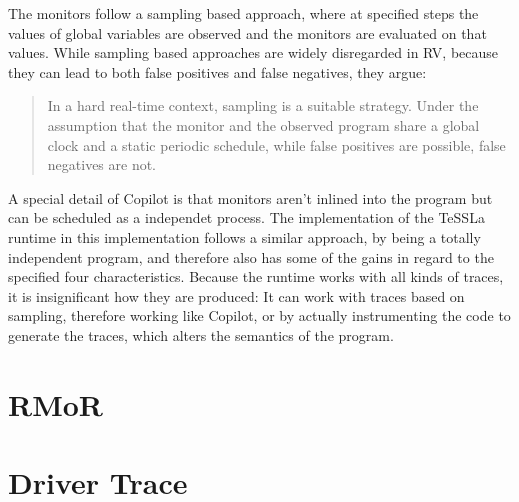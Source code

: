 The monitors follow a sampling based approach, where at specified steps the values of global variables are observed and the monitors are evaluated
on that values.
While sampling based approaches are widely disregarded in RV, because they can lead to both false positives and false negatives,
they argue:

\begin{quote}
  In a hard real-time context, sampling is a suitable strategy. Under
  the assumption that the monitor and the observed program share a global clock and a static periodic schedule, while false positives are possible, false negatives are not.~\cite{Pike2010}
\end{quote}

A special detail of Copilot is that monitors aren't inlined into the program but can be scheduled as a independet process.
The implementation of the TeSSLa runtime in this implementation follows a similar approach, by being a totally independent program,
and therefore also has some of the gains in regard to the specified four characteristics.
Because the runtime works with all kinds of traces, it is insignificant how they are produced:
It can work with traces based on sampling, therefore working like Copilot, or by actually instrumenting the code to generate
the traces, which alters the semantics of the program.


\section{RMoR}
\section{Driver Trace}



